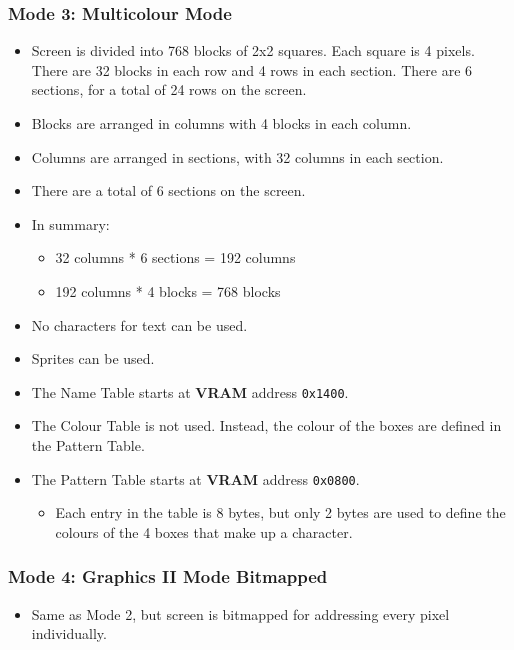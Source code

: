         \subsubsection{Mode 3: \textbf{Multicolour Mode}}
        \begin{itemize}
            \item Screen is divided into 768 blocks of 2x2 squares. Each square
                is 4 pixels. There are 32 blocks in each row and 4 rows in each
                section. There are 6 sections, for a total of 24 rows on the
                screen.
            \item Blocks are arranged in columns with 4 blocks in each column.
            \item Columns are arranged in sections, with 32 columns in each
                section.
            \item There are a total of 6 sections on the screen.
            \item In summary:
            \begin{itemize}
                \item 32 columns * 6 sections = 192 columns
                \item 192 columns * 4 blocks = 768 blocks
            \end{itemize}
            \item No characters for text can be used.
            \item Sprites can be used.
            \item The Name Table starts at \textbf{VRAM} address \texttt{0x1400}.
            \item The Colour Table is not used. Instead, the colour of the boxes
            are defined in the Pattern Table.
            \item The Pattern Table starts at \textbf{VRAM} address \texttt{0x0800}.
            \begin{itemize}
                \item Each entry in the table is 8 bytes, but only 2 bytes are
                        used to define the colours of the 4 boxes that make up
                        a character.
            \end{itemize}
        \end{itemize}

        \subsubsection{Mode 4: \textbf{Graphics II Mode Bitmapped}}
        \begin{itemize}
            \item Same as Mode 2, but screen is bitmapped for addressing every
                pixel individually.
        \end{itemize}

